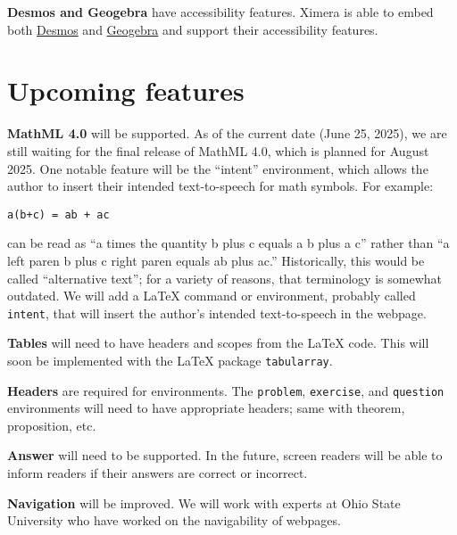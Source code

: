 \documentclass{ximera}
\begin{document}
\medskip
\textbf{Desmos and Geogebra} have accessibility features.  
Ximera is able to embed both \href{https://www.desmos.com/accessibility}{Desmos} and \href{https://help.geogebra.org/hc/en-us/articles/20048444963869-Accessibility}{Geogebra} and support their accessibility features.

\section*{Upcoming features}

\textbf{MathML 4.0} will be supported.  
As of the current date (June 25, 2025), we are still waiting for the final release of MathML 4.0, which is planned for August 2025. One notable feature will be the ``intent'' environment, which allows the author to insert their intended text-to-speech for math symbols. For example:
\begin{verbatim}
a(b+c) = ab + ac
\end{verbatim}
can be read as ``a times the quantity b plus c equals a b plus a c'' rather than ``a left paren b plus c right paren equals ab plus ac.'' Historically, this would be called ``alternative text''; for a variety of reasons, that terminology is somewhat outdated. We will add a \LaTeX{} command or environment, probably called \verb|intent|, that will insert the author’s intended text-to-speech in the webpage.

\medskip
\textbf{Tables} will need to have headers and scopes from the \LaTeX{} code. This will soon be implemented with the \LaTeX{} package \verb|tabularray|.

\medskip
\textbf{Headers} are required for environments.  
The \verb|problem|, \verb|exercise|, and \verb|question| environments will need to have appropriate headers; same with theorem, proposition, etc.

\medskip
\textbf{Answer} will need to be supported.  
In the future, screen readers will be able to inform readers if their answers are correct or incorrect.

\medskip
\textbf{Navigation} will be improved.  
We will work with experts at Ohio State University who have worked on the navigability of webpages.
\end{document}
